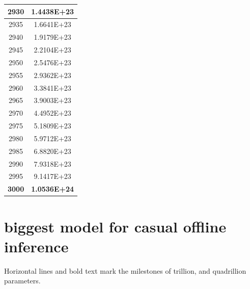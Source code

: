 \documentclass[a4paper]{article}
\begin{document}
\begin{tabular}{| c | c |}
    	2930 & 1.4438E+23 \\\hline
    	2935 & 1.6641E+23 \\\hline
    	2940 & 1.9179E+23 \\\hline
    	2945 & 2.2104E+23 \\\hline
    	2950 & 2.5476E+23 \\\hline
    	2955 & 2.9362E+23 \\\hline
    	2960 & 3.3841E+23 \\\hline
    	2965 & 3.9003E+23 \\\hline
    	2970 & 4.4952E+23 \\\hline
    	2975 & 5.1809E+23 \\\hline
    	2980 & 5.9712E+23 \\\hline
    	2985 & 6.8820E+23 \\\hline
    	2990 & 7.9318E+23 \\\hline
    	2995 & 9.1417E+23 \\\hline
    	\textbf{3000} & \textbf{1.0536E+24} \\\hline
    \end{tabular}
    
    \normalsize
    
    \pagebreak
    
    \section{biggest model for casual offline inference}
    
    Horizontal lines and bold text mark the milestones of trillion, and quadrillion parameters.
    
\end{document}
